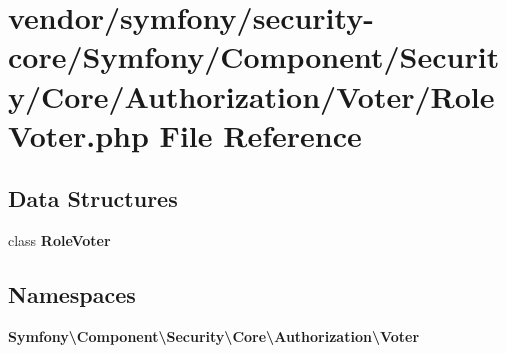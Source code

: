 \section{vendor/symfony/security-\/core/\+Symfony/\+Component/\+Security/\+Core/\+Authorization/\+Voter/\+Role\+Voter.php File Reference}
\label{_role_voter_8php}
\subsection*{Data Structures}
\begin{DoxyCompactItemize}
\item 
class {\bf Role\+Voter}
\end{DoxyCompactItemize}
\subsection*{Namespaces}
\begin{DoxyCompactItemize}
\item 
 {\bf Symfony\textbackslash{}\+Component\textbackslash{}\+Security\textbackslash{}\+Core\textbackslash{}\+Authorization\textbackslash{}\+Voter}
\end{DoxyCompactItemize}
